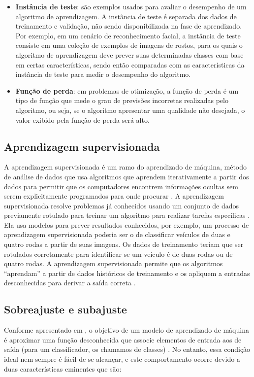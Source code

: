 \documentclass[
	12pt,				%
	oneside,			%
	a4paper,			%
	english,			%
	brazil				%
	]{abntex2ppgsi}
\begin{document}
\begin{itemize}
  \item \textbf{Instância de teste}: são exemplos usados para avaliar o desempenho de um algoritmo de aprendizagem. A instância de teste é separada dos dados de treinamento e validação, não sendo disponibilizada na fase de aprendizado. Por exemplo, em um cenário de reconhecimento facial, a instância de teste consiste em uma coleção de exemplos de imagens de rostos, para os quais o algoritmo de aprendizagem deve prever suas determinadas classes com base em certas características, sendo então comparadas com as características da instância de teste para medir o desempenho do algoritmo.

  \item \textbf{Função de perda}: em problemas de otimização, a função de perda é um tipo de função que mede o grau de previsões incorretas realizadas pelo algoritmo, ou seja, se o algoritmo apresentar uma qualidade não desejada, o valor exibido pela função de perda será alto.
\end{itemize}

\subsection{Aprendizagem supervisionada}
A aprendizagem supervisionada é um ramo do aprendizado de máquina, método de análise de dados que usa algoritmos que aprendem iterativamente a partir dos dados para permitir que os computadores encontrem informações ocultas sem serem explicitamente programados para onde procurar \cite{o2015introduction}. A aprendizagem supervisionada resolve problemas já conhecidos usando um conjunto de dados previamente rotulado para treinar um algoritmo para realizar tarefas específicas \cite{nasteski2017overview}. Ela usa modelos para prever resultados conhecidos, por exemplo, um processo de aprendizagem supervisionada poderia ser o de classificar veículos de duas e quatro rodas a partir de suas imagens. Os dados de treinamento teriam que ser rotulados corretamente para identificar se um veículo é de duas rodas ou de quatro rodas. A aprendizagem supervisionada permite que os algoritmos ``aprendam'' a partir de dados históricos de treinamento e os apliquem a entradas desconhecidas para derivar a saída correta \cite{o2015introduction}.

\subsection{Sobreajuste e subajuste}
Conforme apresentado em , o objetivo de um modelo de aprendizado de máquina é aproximar uma função desconhecida que associe elementos de entrada aos de saída (para um classificador, os chamamos de classes) . No entanto, essa condição ideal nem sempre é fácil de se alcançar, e este comportamento ocorre devido a duas características eminentes que são:
\end{document}
